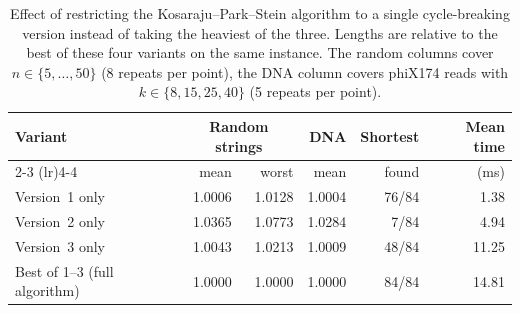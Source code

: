 \begin{table}[htbp]
    \centering
    \caption{Effect of restricting the Kosaraju--Park--Stein algorithm to a single cycle-breaking version instead of taking the heaviest of the three. Lengths are relative to the best of these four variants on the same instance. The random columns cover $n \in \{5,\dots,50\}$ (8 repeats per point), the DNA column covers phiX174 reads with $k \in \{8,15,25,40\}$ (5 repeats per point).}
    \label{tab:bench_kosaraju_versions}
    \small
    \setlength{\tabcolsep}{6pt}
    \renewcommand{\arraystretch}{1.1}
    \begin{tabular}{@{}lrrrrr@{}}
        \toprule
        \textbf{Variant} & \multicolumn{2}{c}{\textbf{Random strings}} & \textbf{DNA} & \textbf{Shortest} & \textbf{Mean time} \\
        \cmidrule(lr){2-3} \cmidrule(lr){4-4}
         & mean & worst & mean & found & (ms) \\
        \midrule
        Version~1 only & 1.0006 & 1.0128 & 1.0004 & 76/84 & 1.38 \\
        Version~2 only & 1.0365 & 1.0773 & 1.0284 & 7/84 & 4.94 \\
        Version~3 only & 1.0043 & 1.0213 & 1.0009 & 48/84 & 11.25 \\
        \addlinespace[2pt]
        Best of 1--3 (full algorithm) & 1.0000 & 1.0000 & 1.0000 & 84/84 & 14.81 \\
        \bottomrule
    \end{tabular}
\end{table}
